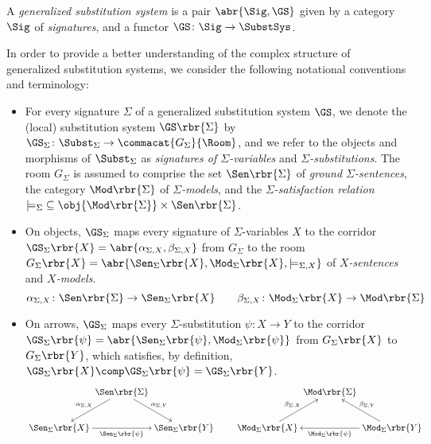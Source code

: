 \documentclass{LMCS}
\begin{document}
  \begin{defi}
    A \emph{generalized substitution system} is a pair \(\abr{\Sig, \GS}\) given by a category \(\Sig\) of \emph{signatures}, and a functor \(\GS \colon \Sig \to \SubstSys\).
  \end{defi}

  \noindent In order to provide a better understanding of the complex structure of generalized substitution systems, we consider the following notational conventions and terminology:
  \begin{itemize}[label=$-$]

  \item For every signature \(\Sigma\) of a generalized substitution system \(\GS\), we denote the (local) substitution system \(\GS\rbr{\Sigma}\) by \(\GS_{\Sigma} \colon \Subst_{\Sigma} \to \commacat{G_{\Sigma}}{\Room}\), and we refer to the objects and morphisms of \(\Subst_{\Sigma}\) as \emph{signatures of \(\Sigma\)\nb-variables} and \emph{\(\Sigma\)\nb-substitutions}.
    The room \(G_{\Sigma}\) is assumed to comprise the set \(\Sen\rbr{\Sigma}\) of \emph{ground \(\Sigma\)\nb-sentences}, the category \(\Mod\rbr{\Sigma}\) of \emph{\(\Sigma\)\nb-models}, and the \emph{\(\Sigma\)\nb-satisfaction relation} \({\models_{\Sigma}} \subseteq \obj{\Mod\rbr{\Sigma}} \times \Sen\rbr{\Sigma}\).

  \item On objects, \(\GS_{\Sigma}\) maps every signature of \(\Sigma\)\nb-variables \(X\) to the corridor \(\GS_{\Sigma}\rbr{X} = \abr{\alpha_{\Sigma, X}, \beta_{\Sigma, X}}\) from \(G_{\Sigma}\) to the room \(G_{\Sigma}\rbr{X} = \abr{\Sen_{\Sigma}\rbr{X}, \Mod_{\Sigma}\rbr{X}, \models_{\Sigma, X}}\) of \emph{\(X\)\nb-sentences} and \emph{\(X\)\nb-models}.
    \[
    \alpha_{\Sigma, X} \colon \Sen\rbr{\Sigma} \to \Sen_{\Sigma}\rbr{X}
    \qquad
    \beta_{\Sigma, X} \colon \Mod_{\Sigma}\rbr{X} \to \Mod\rbr{\Sigma}
    \]

  \item On arrows, \(\GS_{\Sigma}\) maps every \(\Sigma\)\nb-substitution \(\psi \colon X \to Y\) to the corridor \(\GS_{\Sigma}\rbr{\psi} = \abr{\Sen_{\Sigma}\rbr{\psi},\linebreak[0] \Mod_{\Sigma}\rbr{\psi}}\) from \(G_{\Sigma}\rbr{X}\) to \(G_{\Sigma}\rbr{Y}\), which satisfies, by definition, \(\GS_{\Sigma}\rbr{X} \comp \GS_{\Sigma}\rbr{\psi} = \GS_{\Sigma}\rbr{Y}\).
    \[
    \xymatrix @C=0em {
      & {\Sen\rbr{\Sigma}}
      \ar [dl] _{\alpha_{\Sigma, X}}
      \ar [dr] ^{\alpha_{\Sigma, Y}}
      \\
      {\Sen_{\Sigma}\rbr{X}}
      \ar [rr] _{\Sen_{\Sigma}\rbr{\psi}}
      &
      & {\Sen_{\Sigma}\rbr{Y}}
    }
    \qquad
    \xymatrix @C=0em {
      & {\Mod\rbr{\Sigma}}
      \\
      {\Mod_{\Sigma}\rbr{X}}
      \ar [ur] ^{\beta_{\Sigma, X}}
      &
      & {\Mod_{\Sigma}\rbr{Y}}
      \ar [ul] _{\beta_{\Sigma, Y}}
      \ar [ll] ^{\Mod_{\Sigma}\rbr{\psi}}
    }
    \]


\end{itemize}
\end{document}
